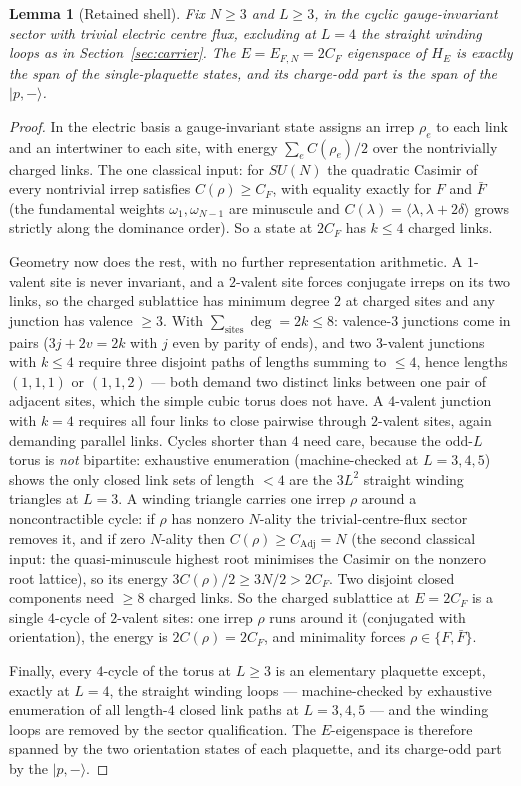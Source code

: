 \documentclass[11pt]{article}
\theoremstyle{plain}
\newtheorem{lemma}[theorem]{Lemma}
\theoremstyle{definition}
\theoremstyle{remark}
\newcommand{\CF}{C_F}
\begin{document}
\begin{lemma}[Retained shell]\label{lem:shell}
Fix $N\ge3$ and $L\ge3$, in the cyclic gauge-invariant sector with trivial
electric centre flux, excluding at $L=4$ the straight winding loops as in
Section~\ref{sec:carrier}. The $E=E_{F,N}=2\CF$ eigenspace of $H_E$ is
exactly the span of the single-plaquette states, and its charge-odd part is
the span of the $|p,-\rangle$.
\end{lemma}

\begin{proof}
In the electric basis a gauge-invariant state assigns an irrep $\rho_e$ to
each link and an intertwiner to each site, with energy
$\sum_e C(\rho_e)/2$ over the nontrivially charged links. The one classical
input: for $SU(N)$ the quadratic Casimir of every nontrivial irrep satisfies
$C(\rho)\ge\CF$, with equality exactly for $F$ and $\bar F$ (the fundamental
weights $\omega_1,\omega_{N-1}$ are minuscule and $C(\lambda)
=\langle\lambda,\lambda+2\delta\rangle$ grows strictly along the dominance
order). So a state at $2\CF$ has $k\le4$ charged links.

Geometry now does the rest, with no further representation arithmetic. A
$1$-valent site is never invariant, and a $2$-valent site forces conjugate
irreps on its two links, so the charged sublattice has minimum degree $2$ at
charged sites and any junction has valence $\ge3$. With
$\sum_{\text{sites}}\deg=2k\le8$: valence-$3$ junctions come in pairs
($3j+2v=2k$ with $j$ even by parity of ends), and two $3$-valent junctions
with $k\le4$ require three disjoint paths of lengths summing to $\le4$,
hence lengths $(1,1,1)$ or $(1,1,2)$ --- both demand two distinct links
between one pair of adjacent sites, which the simple cubic torus does not
have. A $4$-valent junction with $k=4$ requires all four links to close
pairwise through $2$-valent sites, again demanding parallel links. Cycles
shorter than $4$ need care, because the odd-$L$ torus is \emph{not}
bipartite: exhaustive enumeration (machine-checked at $L=3,4,5$) shows the
only closed link sets of length $<4$ are the $3L^2$ straight winding
triangles at $L=3$. A winding triangle carries one irrep $\rho$ around a
noncontractible cycle: if $\rho$ has nonzero $N$-ality the trivial-centre-flux
sector removes it, and if zero $N$-ality then $C(\rho)\ge C_{\mathrm{Adj}}=N$
(the second classical input: the quasi-minuscule highest root minimises the
Casimir on the nonzero root lattice), so its energy $3C(\rho)/2\ge3N/2>2\CF$.
Two disjoint closed components need $\ge8$ charged links. So the charged
sublattice at $E=2\CF$ is a single $4$-cycle of $2$-valent sites: one irrep
$\rho$ runs around it (conjugated with orientation), the energy is
$2C(\rho)=2\CF$, and minimality forces $\rho\in\{F,\bar F\}$.

Finally, every $4$-cycle of the torus at $L\ge3$ is an elementary plaquette
except, exactly at $L=4$, the straight winding loops --- machine-checked by
exhaustive enumeration of all length-$4$ closed link paths at $L=3,4,5$ ---
and the winding loops are removed by the sector qualification. The
$E$-eigenspace is therefore spanned by the two orientation states of each
plaquette, and its charge-odd part by the $|p,-\rangle$.
\end{proof}
\end{document}
